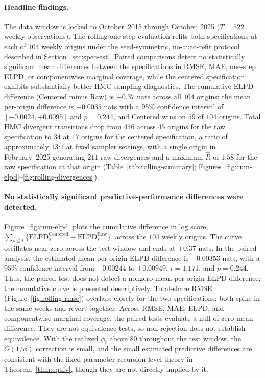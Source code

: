 \documentclass[12pt]{article}
\theoremstyle{remark}
\newcommand{\elpd}{\mathrm{ELPD}}
\begin{document}
\paragraph{Headline findings.}
The data window is locked to October~2015 through October~2025 ($T=522$ weekly observations). The rolling one-step evaluation refits both specifications at each of $104$ weekly origins under the seed-symmetric, no-auto-refit protocol described in Section~\ref{sec:spec-est}. Paired comparisons detect no statistically significant mean differences between the specifications in RMSE, MAE, one-step ELPD, or componentwise marginal coverage, while the centered specification exhibits substantially better HMC sampling diagnostics. The cumulative ELPD difference (Centered minus Raw) is $+0.37$ nats across all $104$ origins; the mean per-origin difference is $+0.0035$ nats with a $95\%$ confidence interval of $[-0.0024,+0.0095]$ and $p=0.244$, and Centered wins on $59$ of $104$ origins. Total HMC divergent transitions drop from $446$ across $45$ origins for the raw specification to $34$ at $17$ origins for the centered specification, a ratio of approximately $13$:$1$ at fixed sampler settings, with a single origin in February~2025 generating $211$ raw divergences and a maximum $\widehat{R}$ of $1.58$ for the raw specification at that origin (Table~\ref{tab:rolling-summary}; Figures~\ref{fig:cum-elpd}--\ref{fig:rolling-divergences}).

\paragraph{No statistically significant predictive-performance differences were detected.}
Figure~\ref{fig:cum-elpd} plots the cumulative difference in log score, $\sum_{s\le t}\{\elpd_s^{\text{Centered}}-\elpd_s^{\text{Raw}}\}$, across the $104$ weekly origins. The curve oscillates near zero across the test window and ends at $+0.37$ nats. In the paired analysis, the estimated mean per-origin ELPD difference is $+0.00353$ nats, with a $95\%$ confidence interval from $-0.00244$ to $+0.00949$, $t=1.171$, and $p=0.244$. Thus, the paired test does not detect a nonzero mean per-origin ELPD difference; the cumulative curve is presented descriptively. Total-share RMSE (Figure~\ref{fig:rolling-rmse}) overlaps closely for the two specifications: both spike in the same weeks and revert together. Across RMSE, MAE, ELPD, and componentwise marginal coverage, the paired tests evaluate a null of zero mean difference. They are not equivalence tests, so non-rejection does not establish equivalence. With the realized $\phi_t$ above $80$ throughout the test window, the $O(1/\phi)$ correction is small, and the small estimated predictive differences are consistent with the fixed-parameter recursion-level theory in Theorem~\ref{thm:equiv}, though they are not directly implied by it.
\end{document}
